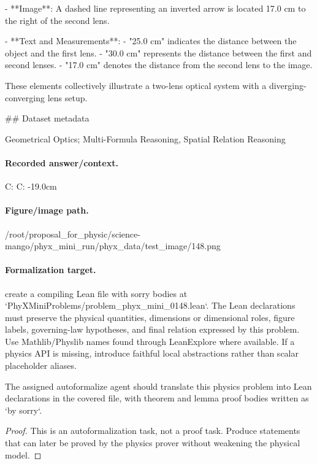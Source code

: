 - **Image**: A dashed line representing an inverted arrow is located 17.0 cm to the right of the second lens.

- **Text and Measurements**:
  - "25.0 cm" indicates the distance between the object and the first lens.
  - "30.0 cm" represents the distance between the first and second lenses.
  - "17.0 cm" denotes the distance from the second lens to the image.

These elements collectively illustrate a two-lens optical system with a diverging-converging lens setup.

\#\# Dataset metadata

Geometrical Optics; Multi-Formula Reasoning, Spatial Relation Reasoning

\paragraph{Recorded answer/context.}
C: C: -19.0cm

\paragraph{Figure/image path.}
/root/proposal\_for\_physic/science-mango/phyx\_mini\_run/phyx\_data/test\_image/148.png

\paragraph{Formalization target.}
create a compiling Lean file with sorry bodies at `PhyXMiniProblems/problem\_phyx\_mini\_0148.lean`. The Lean declarations must preserve the physical quantities, dimensions or dimensional roles, figure labels, governing-law hypotheses, and final relation expressed by this problem.
Use Mathlib/Physlib names found through LeanExplore where available. If a physics API is missing, introduce faithful local abstractions rather than scalar placeholder aliases.

\begin{theorem}
\label{thm:physics:phyx_mini_0148:target}
The assigned autoformalize agent should translate this physics problem into Lean declarations in the covered file, with theorem and lemma proof bodies written as `by sorry`.
\end{theorem}
\begin{proof}
This is an autoformalization task, not a proof task. Produce statements that can later be proved by the physics prover without weakening the physical model.
\end{proof}

